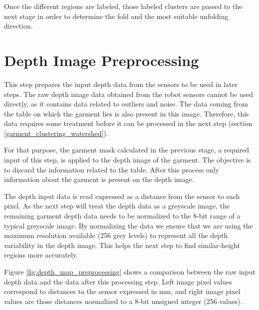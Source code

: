 Once the different regions are labeled, those labeled clusters are passed to the next stage in order to determine the fold and the most suitable unfolding direction.

\section{Depth Image Preprocessing}
\label{depth_image_preprocessing}

This step prepares the input depth data from the sensors to be used in later steps. The raw depth image data obtained from the robot sensors cannot be used directly, as it contains data related to outliers and noise. The data coming from the table on which the garment lies is also present in this image. Therefore, this data requires some treatment before it can be processed in the next step (section \ref{garment_clustering_watershed}). 

For that purpose, the garment mask calculated in the previous stage, a required input of this step, is applied to the depth image of the garment. The objective is to discard the information related to the table. After this process only information about the garment is present on the depth image.

The depth input data is read expressed as a distance from the sensor to each pixel. As the next step will treat the depth data as a greyscale image, the remaining garment depth data needs to be normalized to the 8-bit range of a typical greyscale image. By normalizing the data we ensure that we are using the maximum resolution available (256 grey levels) to represent all the depth variability in the depth image. This helps the next step to find similar-height regions more accurately.

Figure \ref{fig:depth_map_preprocessing}  shows a comparison between the raw input depth data and the data after this processing step. Left image pixel values correspond to distances to the sensor expressed in mm, and right image pixel values are those distances normalized to a 8-bit unsigned integer (256 values).

